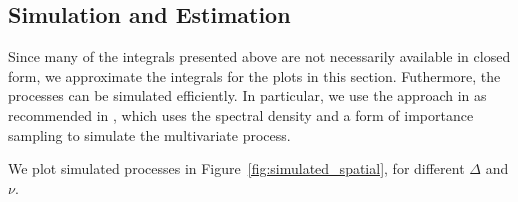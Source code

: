 \documentclass[11pt]{article}
\begin{document}
\subsection{Simulation and Estimation}

Since many of the integrals presented above are not necessarily available in closed form, we approximate the integrals for the plots in this section. Futhermore, the processes can be simulated efficiently. In particular, we use the approach in \cite{emery_improved_2016} as recommended in \cite{alegria_bivariate_2021}, which uses the spectral density and a form of importance sampling to simulate the multivariate process. 

We plot simulated processes in Figure~\ref{fig:simulated_spatial}, for different $\Delta$ and $\nu$.
\end{document}
